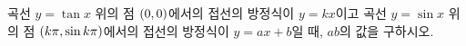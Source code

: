 곡선 $y=\tan x$ 위의 점 $(0{,}\mkern3mu\mathopen{}0)$에서의 접선의 방정식이 $y=kx$이고 곡선 $y=\sin x$ 위의 점 $(k\pi{,}\mkern3mu\mathopen{}\sin k\pi)$에서의 접선의 방정식이 $y=ax+b$일 때, $ab$의 값을 구하시오. 
